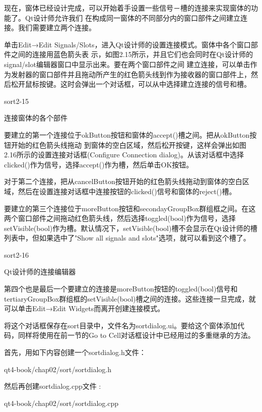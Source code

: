 \documentclass[11pt,oneside]{book}
\begin{document}
\begin{common-format}
现在，窗体已经设计完成，可以开始着手设置一些信号－槽的连接来实现窗体的功能了。Qt设计师允许我们
在构成同一窗体的不同部分内的窗口部件之间建立连接。我们需要建立两个连接。

单击Edit→Edit Signals/Slots，进入Qt设计师的设置连接模式。窗体中各个窗口部件之间的连接用蓝色箭头表
示，如图2.15所示，并且它们也会同时在Qt设计师的signal/slot编辑器窗口中显示出来。要在两个窗口部件之间
建立连接，可以单击作为发射器的窗口部件并且拖动所产生的红色箭头线到作为接收器的窗口部件上，然后松开鼠标按键。这时会弹出一个对话框，可以从中选择建立连接的信号和槽。

\begin{fig}{sort2-15}
\caption{连接窗体的各个部件}
\label{fig:sort2-15}
\end{fig}

要建立的第一个连接位于okButton按钮和窗体的accept()槽之间。把从okButton按钮开始的红色箭头线拖动
到窗体的空白区域，然后松开按键，这样会弹出如图2.16所示的设置连接对话框(Configure Connection dialog)。从该对话框中选择clicked()作为信号，选择accept()作为槽，然后单击OK按钮。

对于第二个连接，把从cancelButton按钮开始的红色箭头线拖动到窗体的空白区域，然后在设置连接对话框中连接按钮的clicked()信号和窗体的reject()槽。

要建立的第三个连接位于moreButton按钮和secondayGroupBox群组框之间。在这两个窗口部件之间拖动红色箭头线，然后选择toggled(bool)作为信号，选择setVisible(bool)作为槽。默认情况下，setVisible(bool)槽不会显示在Qt设计师的槽列表中，但如果选中了"Show all signals and slots"选项，就可以看到这个槽了。

\begin{linefig}[0.8]{sort2-16}
\caption{Qt设计师的连接编辑器}
\label{fig:sort2-16}
\end{linefig}

第四个也是最后一个要建立的连接是moreButton按钮的toggled(bool)信号和tertiaryGroupBox群组框的setVisible(bool)槽之间的连接。这些连接一旦完成，就可以单击Edit→Edit Widgets而离开创建连接模式。

将这个对话框保存在sort目录中，文件名为sortdialog.ui。要给这个窗体添加代码，同样将使用在前一节的Go to Cell对话框设计中已经用过的多重继承的方法。

首先，用如下内容创建一个sortdialog.h文件：
\begin{cppinput}{qt4-book/chap02/sort/sortdialog.h}
\end{cppinput}

然后再创建sortdialog.cpp文件 :
\begin{cppinput}{qt4-book/chap02/sort/sortdialog.cpp}
\end{cppinput}


\end{common-format}
\end{document}
